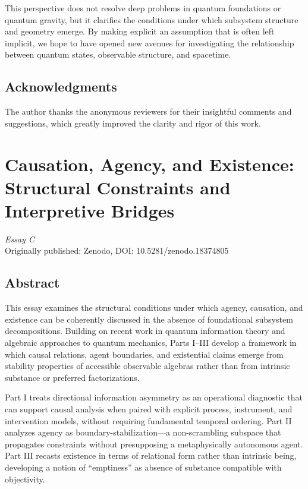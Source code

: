 \documentclass[12pt,a4paper,openany]{book}
\begin{document}
This perspective does not resolve deep problems in quantum foundations or quantum gravity, but it clarifies the conditions under which subsystem structure and geometry emerge. By making explicit an assumption that is often left implicit, we hope to have opened new avenues for investigating the relationship between quantum states, observable structure, and spacetime.

\section*{Acknowledgments}

The author thanks the anonymous reviewers for their insightful comments and suggestions, which greatly improved the clarity and rigor of this work.

\chapter{Causation, Agency, and Existence: Structural Constraints and Interpretive Bridges}
\label{chap:paperC}

\begin{center}
\textit{Essay C}\\[0.5em]
Originally published: Zenodo, DOI: 10.5281/zenodo.18374805
\end{center}

\bigskip

\section*{Abstract}
This essay examines the structural conditions under which agency, causation, and existence can be coherently discussed in the absence of foundational subsystem decompositions. Building on recent work in quantum information theory and algebraic approaches to quantum mechanics, Parts I--III develop a framework in which causal relations, agent boundaries, and existential claims emerge from stability properties of accessible observable algebras rather than from intrinsic substance or preferred factorizations.

Part I treats directional information asymmetry as an operational diagnostic that can support causal analysis when paired with explicit process, instrument, and intervention models, without requiring fundamental temporal ordering. Part II analyzes agency as boundary-stabilization—a non-scrambling subspace that propagates constraints without presupposing a metaphysically autonomous agent. Part III recasts existence in terms of relational form rather than intrinsic being, developing a notion of ``emptiness'' as absence of substance compatible with objectivity.
\end{document}
